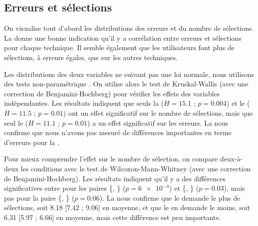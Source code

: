 \subsection{Erreurs et sélections}
\label{subsec:experiment_results_errors}


On visualise tout d'abord les distributions des erreurs et du nombre de sélections. La  donne une bonne indication qu'il y a corrélation entre erreurs et sélections pour chaque technique. Il semble également que les utilisateurs  font plus de sélections, à erreurs égales, que sur les autres techniques.

Les distributions des deux variables ne suivant pas une loi normale, nous utilisons des tests non-paramétrique \citep{Wobbrock2016}. On utilise alors le test de Kruskal-Wallis (avec une correction de Benjamini-Hochberg) pour vérifier les effets des variables indépendantes. Les résultats indiquent que seuls la  ($H = \num{15.1}$ ; $p = \num{0.004}$) et le  ($H = \num{11.5}$ ; $p = \num{0.01}$) ont un effet significatif sur le nombre de sélections, mais que seul le  ($H = \num{11.1}$ ; $p = \num{0.01}$) a un effet significatif sur les erreurs. La  nous confirme que nous n'avons pas mesuré de différences importantes en terme d'erreurs pour la .


Pour mieux comprendre l'effet sur le nombre de sélection, on compare deux-à-deux les conditions  avec le test de Wilcoxon-Mann-Whitney (avec une correction de Benjamini-Hochberg). Les résultats indiquent qu'il y a des différences significatives entre pour les paires \{, \} ($p = \num{6e-4}$) et \{, \} ($p = \num{0.03}$), mais pas pour la paire \{, \} ($p = \num{0.06}$). La  nous confirme que le  demande le plus de sélections, soit \num{8.18} [\num{7.42} ; \num{9.06}] en moyenne, et que le  en demande le moins, soit \num{6.31} [\num{5.97} ; \num{6.66}] en moyenne, mais cette différence est peu importante.

